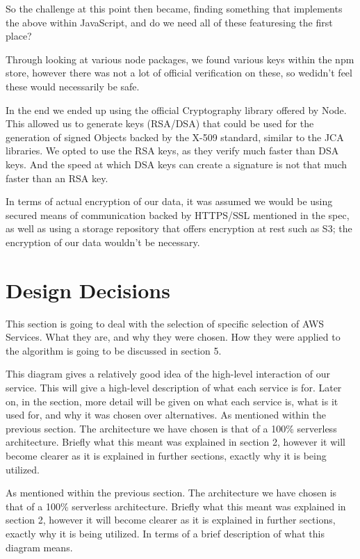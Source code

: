 \documentclass[runningheads]{llncs}
\begin{document}
So the challenge at this point then became, finding something that implements the above within JavaScript, and do we need all of these featuresing the first place?

Through looking at various node packages, we found various keys within the npm store, however there was not a lot of official verification on these, so wedidn't feel these would necessarily be safe.

In the end we ended up using the official Cryptography library offered by Node. This allowed us to generate keys (RSA/DSA) that could be used for the generation of signed Objects backed by the X-509 standard, similar to the JCA libraries. We opted to use the RSA keys, as they verify much faster than DSA keys. And the speed at which DSA keys can create a signature is not that much faster than an RSA key.

In terms of actual encryption of our data, it was assumed we would be using secured means of communication backed by HTTPS/SSL mentioned in the spec, as well as using a storage repository that offers encryption at rest such as S3; the encryption of our data wouldn't be necessary.

\section{Design Decisions}
This section is going to deal with the selection of specific selection of AWS Services. What they are, and why they were chosen. How they were applied to the algorithm is going to be discussed in section 5.

This diagram gives a relatively good idea of the high-level interaction of our service. This will give a high-level description of what each service is for. Later on, in the section, more detail will be given on what each service is, what is it used for, and why it was chosen over alternatives. As mentioned within the previous section. The architecture we have chosen is that of a 100\% serverless architecture. Briefly what this meant was explained in section 2, however it will become clearer as it is explained in further sections, exactly why it is being utilized.

As mentioned within the previous section. The architecture we have chosen is that of a 100\% serverless architecture. Briefly what this meant was explained in section 2, however it will become clearer as it is explained in further sections, exactly why it is being utilized. In terms of a brief description of what this diagram means.
\end{document}
